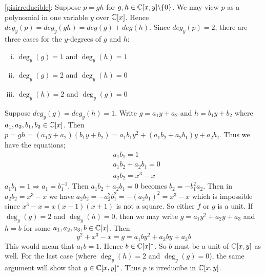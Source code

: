 \begin{solution}
	\eqref{pisirreducible}: Suppose $p = gh $ for $g,h \in \mathbb{C}[x,y] \backslash \lbrace 0 \rbrace $. 
	We may view $p$ as a polynomial in one variable $y$ over $\mathbb{C}[x]$. 
	Hence $deg_y(p)= deg_y(gh) = deg(g) + deg(h)$. Since $deg_y(p)=2$, 
	there are three cases for the $y$-degrees of $g$ and $h$: 
	\begin{enumerate}[(i)]
		\item $\deg_y(g) = 1$ and $\deg_y(h) = 1$ 
		\item $\deg_y(g) = 2$ and $\deg_y(h) = 0$ 
		\item $\deg_y(h) = 2$ and $\deg_y(g) = 0$
	\end{enumerate}
	Suppose $deg_y(g)=deg_y(h)=1$. 
	Write $g= a_1y + a_2$ and $h= b_1y + b_2$ where
	$a_1,a_2,b_1,b_2 \in \mathbb{C}[x]$. 
	Then $p = gh = (a_1y + a_2)(b_1y + b_2) = a_1b_1y^2 + (a_1b_2 + a_2b_1)y + a_2b_2 $.
	Thus we have the equations;
	\begin{align*}
	&a_1b_1 = 1  \\
	&a_1b_2 + a_2b_1 = 0 \\
	&a_2b_2 = x^3 - x 
	\end{align*} 
	$a_1b_1 = 1 \Longrightarrow a_1 = b_1^{-1}$. 
	Then $a_1b_2 + a_2b_1 = 0$ becomes
	$b_2=- b_1^2a_2$. Then in $a_2b_2 = x^3 - x $ we have
	$a_2b_2 = - a_2^2b_1^2 = - (a_2b_1)^2 = x^3 - x$ which is 
	impossible since $x^3 - x = x(x-1)(x+1)$ is not a 
	square. So either $f$ or $g$ is a unit. 
	If $\deg_y(g) = 2$ and $\deg_y(h) = 0$, then we 
	may write $g = a_1y^2 + a_2y + a_3$ and $h = b$ for some 
	$a_1,a_2,a_3,b \in \mathbb{C}[x]$. 
	Then $$y^2 +x^3 - x = g = a_1by^2 + a_2by + a_3b$$
	This would mean that $a_1b= 1$. Hence $b \in \mathbb{C}[x]^* $.
	So $b$ must be a unit of $\mathbb{C}[x,y]$ as well. For the last
	case (where $\deg_y(h) = 2$ and $\deg_y(g) = 0$), the same 
	argument will show that $g \in \mathbb{C}[x,y]^*$.
	Thus $p$ is irreducibe in $\mathbb{C}[x,y]$.  \\


\end{solution}
